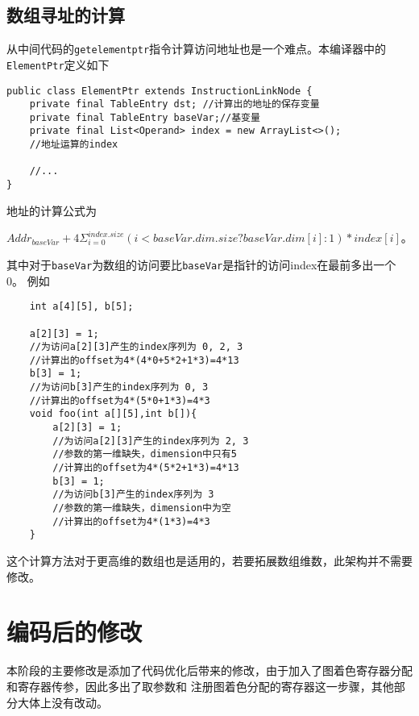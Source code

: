 \subsection{数组寻址的计算}

从中间代码的\texttt{getelementptr}指令计算访问地址也是一个难点。本编译器中的\texttt{ElementPtr}定义如下
\begin{verbatim}
public class ElementPtr extends InstructionLinkNode {
    private final TableEntry dst; //计算出的地址的保存变量
    private final TableEntry baseVar;//基变量
    private final List<Operand> index = new ArrayList<>();
    //地址运算的index

    //...    
}
\end{verbatim}

地址的计算公式为

$Addr_{baseVar} + 4\Sigma_{i = 0} ^ {index.size} (i < baseVar.dim.size ? baseVar.dim[i] : 1) * index[i]$。

其中对于\texttt{baseVar}为数组的访问要比\texttt{baseVar}是指针的访问index在最前多出一个0。
例如
\begin{verbatim}
    int a[4][5], b[5];

    a[2][3] = 1;
    //为访问a[2][3]产生的index序列为 0, 2, 3
    //计算出的offset为4*(4*0+5*2+1*3)=4*13
    b[3] = 1;
    //为访问b[3]产生的index序列为 0, 3
    //计算出的offset为4*(5*0+1*3)=4*3
    void foo(int a[][5],int b[]){
        a[2][3] = 1;
        //为访问a[2][3]产生的index序列为 2, 3
        //参数的第一维缺失，dimension中只有5
        //计算出的offset为4*(5*2+1*3)=4*13
        b[3] = 1;
        //为访问b[3]产生的index序列为 3
        //参数的第一维缺失，dimension中为空
        //计算出的offset为4*(1*3)=4*3
    }
\end{verbatim}

这个计算方法对于更高维的数组也是适用的，若要拓展数组维数，此架构并不需要修改。

\section{编码后的修改}
本阶段的主要修改是添加了代码优化后带来的修改，由于加入了图着色寄存器分配和寄存器传参，因此多出了取参数和
注册图着色分配的寄存器这一步骤，其他部分大体上没有改动。